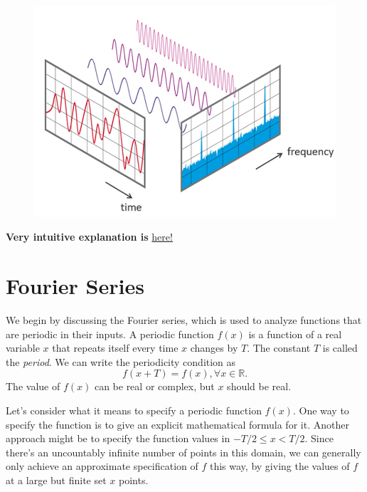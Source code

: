 \begin{figure}[h]
	\centering
	\includegraphics[scale=0.4]{./images/fourier/fourier_intuition.png}
\end{figure}
\textbf{Very intuitive explanation is} \href{https://devincody.github.io/Blog/post/an_intuitive_interpretation_of_the_fourier_transform/}{here!}



\section{Fourier Series}
\label{sec:fourier_series}

We begin by discussing the Fourier series, which is used to analyze functions that are periodic in their inputs. A periodic function $f(x)$ is a function of a real variable $x$ that repeats itself every time $x$ changes by $T$. The constant $T$ is called the \textit{period}. We can write the periodicity condition as
$$f(x+T) = f(x), \forall x\in \mathbb{R}.$$
The value of $f(x)$ can be real or complex, but $x$ should be real.

Let's consider what it means to specify a periodic function $f(x)$. One way to specify the function is to give an explicit mathematical formula for it. Another approach might be to specify the function values in $−T/2 \leq x < T/2$. Since there's an uncountably infinite number of points in this domain, we can generally only achieve an approximate specification of $f$ this way, by giving the values of $f$ at a large but finite set $x$ points. 

